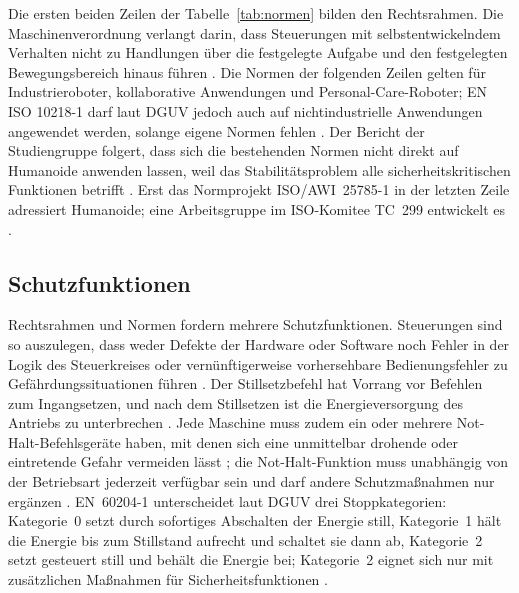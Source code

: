 Die ersten beiden Zeilen der Tabelle~\ref{tab:normen} bilden den Rechtsrahmen.
Die Maschinenverordnung verlangt darin, dass Steuerungen mit selbstentwickelndem Verhalten nicht zu Handlungen über die festgelegte Aufgabe und den festgelegten Bewegungsbereich hinaus führen \cite{MVO2023}.
Die Normen der folgenden Zeilen gelten für Industrieroboter, kollaborative Anwendungen und Personal-Care-Roboter; EN ISO 10218-1 darf laut DGUV jedoch auch auf nichtindustrielle Anwendungen angewendet werden, solange eigene Normen fehlen \cite{DGUV2015}.
Der Bericht der Studiengruppe folgert, dass sich die bestehenden Normen nicht direkt auf Humanoide anwenden lassen, weil das Stabilitätsproblem alle sicherheitskritischen Funktionen betrifft \cite{Prather2025}.
Erst das Normprojekt ISO/AWI~25785-1 in der letzten Zeile adressiert Humanoide; eine Arbeitsgruppe im ISO-Komitee TC~299 entwickelt es \cite{Prather2025}.

\subsection{Schutzfunktionen}
\label{sec:schutzfunktionen}
Rechtsrahmen und Normen fordern mehrere Schutzfunktionen.
Steuerungen sind so auszulegen, dass weder Defekte der Hardware oder Software noch Fehler in der Logik des Steuerkreises oder vernünftigerweise vorhersehbare Bedienungsfehler zu Gefährdungssituationen führen \cite{MRL2006}.
Der Stillsetzbefehl hat Vorrang vor Befehlen zum Ingangsetzen, und nach dem Stillsetzen ist die Energieversorgung des Antriebs zu unterbrechen \cite{MRL2006}.
Jede Maschine muss zudem ein oder mehrere Not-Halt-Befehlsgeräte haben, mit denen sich eine unmittelbar drohende oder eintretende Gefahr vermeiden lässt \cite{MRL2006}; die Not-Halt-Funktion muss unabhängig von der Betriebsart jederzeit verfügbar sein und darf andere Schutzmaßnahmen nur ergänzen \cite{MRL2006}.
EN~60204-1 unterscheidet laut DGUV drei Stoppkategorien: Kategorie~0 setzt durch sofortiges Abschalten der Energie still, Kategorie~1 hält die Energie bis zum Stillstand aufrecht und schaltet sie dann ab, Kategorie~2 setzt gesteuert still und behält die Energie bei; Kategorie~2 eignet sich nur mit zusätzlichen Maßnahmen für Sicherheitsfunktionen \cite{DGUV2015}.

